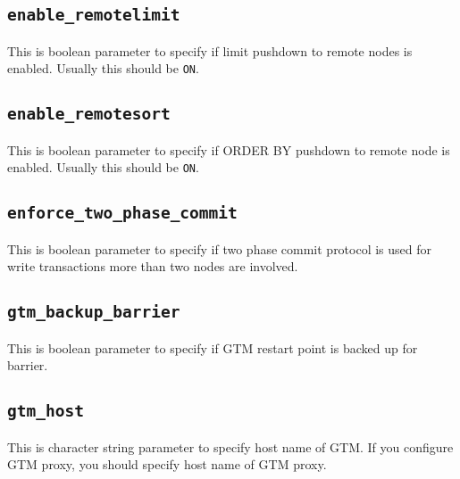 \subsection*{\label{subsec:enableRemotelimit}\texttt{enable\_remotelimit}}

  This is boolean parameter to specify if limit pushdown to remote nodes is enabled.
  Usually this should be {\tt ON}.



\subsection*{\label{subsec:enableRemotesort}\texttt{enable\_remotesort}}

  This is boolean parameter to specify if ORDER BY pushdown to remote node is enabled.
  Usually this should be {\tt ON}.



\subsection*{\label{subsec:enforceTwoPhaseCommit}\texttt{enforce\_two\_phase\_commit}}

  This is boolean parameter to specify if two phase commit protocol is used for
  write transactions more than two nodes are involved.



\subsection*{\label{subsec:gtmBackupBarrier}\texttt{gtm\_backup\_barrier}}

  This is boolean parameter to specify if GTM restart point is backed up for barrier.



\subsection*{\label{subsec:gtmHost}\texttt{gtm\_host}}

  This is character string parameter to specify host name of GTM.
  If you configure GTM proxy, you should specify host name of GTM proxy.


